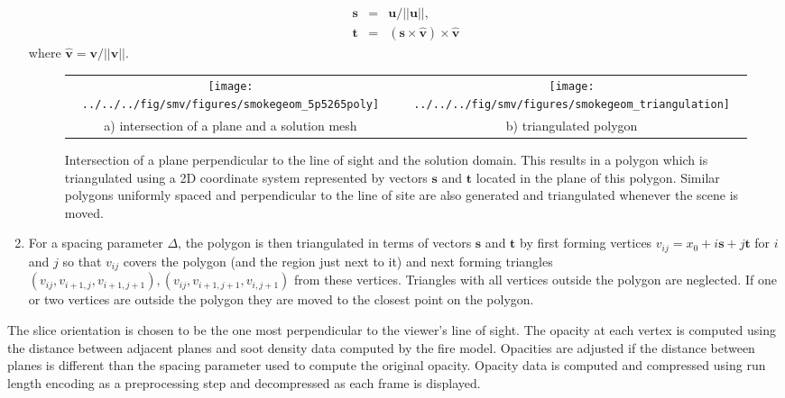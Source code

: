 \documentclass[11pt]{article}
\newcommand{\vvec}[1]{\mathbf{#1}}
\begin{document}
\begin{enumerate}
      \begin{eqnarray*}
    \vvec{s}&=&\vvec{u}/||\vvec{u}||,\\
    \vvec{t}&=&(\vvec{s} \times \hat{\vvec{v}} ) \times \hat{\vvec{v}}
    \end{eqnarray*}
    where $\hat{\vvec{v}}=\vvec{v}/||\vvec{v}||$.

\begin{figure}[bph]
\begin{center}
\begin{tabular}{cc}
\texttt{[image: ../../../fig/smv/figures/smokegeom\_5p5265poly]}&
\texttt{[image: ../../../fig/smv/figures/smokegeom\_triangulation]}\\
a) intersection of a plane and a solution mesh& b) triangulated polygon
\end{tabular}
\end{center}
\caption{Intersection of a plane perpendicular to the line of sight and the solution
domain.  This results in a polygon which is triangulated
using a  2D coordinate system represented by vectors $\vvec{s}$ and $\vvec{t}$ located in the plane of this polygon.
Similar polygons uniformly spaced and perpendicular to the line of site are also generated and triangulated whenever the scene is moved.}
\label{fig:smoketriangulate}
\end{figure}

\item For a spacing parameter $\Delta$, the polygon is then triangulated in terms of vectors $\vvec{s}$ and $\vvec{t}$ by first
forming vertices $v_{ij}=x_0 + i\vvec{s} + j \vvec{t}$ for $i$ and $j$ so that $v_{ij}$ covers the polygon (and the region just next to it)
and next forming triangles $(v_{ij},v_{i+1,j},v_{i+1,j+1}), (v_{ij},v_{i+1,j+1},v_{i,j+1})$
from these vertices.
Triangles with all vertices outside the polygon are neglected.
If one or two vertices are outside the polygon they are moved to the closest point on the polygon.

\end{enumerate}

The slice orientation
is chosen to be the one most perpendicular to the viewer's line of
sight.  The opacity at each vertex is computed using the
distance between adjacent planes and soot density
data computed by the fire model.  Opacities are adjusted if the distance
between planes is different than the spacing parameter used to compute the original opacity.
Opacity data is
computed and compressed using run length encoding as a
preprocessing step and decompressed as each frame is
displayed.
\end{document}
